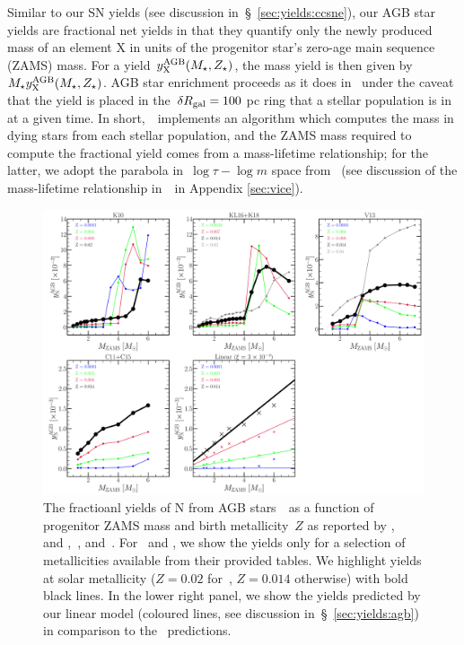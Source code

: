 \documentclass[ms.tex]{subfiles}
\begin{document}
Similar to our SN yields (see discussion in~\S~\ref{sec:yields:ccsne}), our
AGB star yields are fractional net yields in that they quantify only the newly
produced mass of an element X in units of the progenitor star's zero-age main
sequence (ZAMS) mass.
For a yield~$y_\text{X}^\text{AGB}(M_\star, Z_\star)$, the mass yield is then
given by~$M_\star y_\text{X}^\text{AGB}(M_\star, Z_\star)$.
AGB star enrichment proceeds as it does in~\citet{Johnson2020} under the caveat
that the yield is placed in the~$\delta R_\text{gal} = 100$ pc ring that a stellar
population is in at a given time.
In short,~\vice~implements an algorithm which computes the mass in dying stars
from each stellar population, and the ZAMS mass required to compute the
fractional yield comes from a mass-lifetime relationship; for the latter, we
adopt the parabola in~$\log\tau - \log m$ space from~\citet{Larson1974} (see
discussion of the mass-lifetime relationship in~\vice~in Appendix
\ref{sec:vice}).

\begin{figure}
\centering
\includegraphics[scale = 0.32]{agb_yield_models.pdf}
\caption{
The fractioanl yields of N from AGB stars~~as a function of progenitor
ZAMS mass and birth metallicity~$Z$ as reported by
\citet[][upper left]{Karakas2010},~\citet{Karakas2016} and
\citet[][upper middle]{Karakas2018},~\citet[][upper right]{Ventura2013,
Ventura2014, Ventura2018, Ventura2020}, and~\citet[][lower right]{Cristallo2011,
Cristallo2015}.
For~\citet{Ventura2013, Ventura2014, Ventura2018, Ventura2020} and
\citet{Cristallo2011, Cristallo2015}, we show the yields only for a selection
of metallicities available from their provided tables.
We highlight yields at solar metallicity ($Z = 0.02$ for~\citealp{Karakas2010},
$Z = 0.014$ otherwise) with bold black lines.
In the lower right panel, we show the yields predicted by our linear model
(coloured lines, see discussion in~\S~\ref{sec:yields:agb}) in comparison to
the~\citet[][coloured X's]{Cristallo2011, Cristallo2015} predictions.
}
\label{fig:agb_yield_models}
\end{figure}
\end{document}
